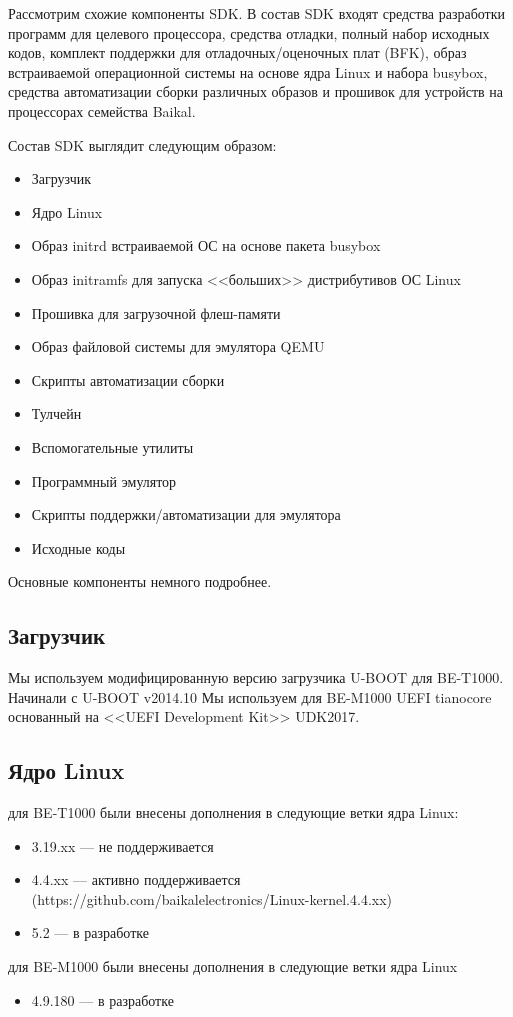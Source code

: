 \documentclass[10pt, a5paper]{article}
\begin{document}
Рассмотрим схожие компоненты SDK. В состав SDK входят средства разработки программ для целевого процессора, средства отладки, полный набор исходных кодов, комплект поддержки для отладочных/оценочных плат (BFK), образ встраиваемой операционной системы на основе ядра Linux и набора busybox, средства автоматизации сборки различных образов и прошивок для устройств на процессорах семейства Baikal.

Состав SDK выглядит следующим образом:

\begin{itemize}
  \item Загрузчик
  \item Ядро Linux
  \item Образ initrd встраиваемой ОС на основе пакета busybox
  \item Образ initramfs для запуска <<больших>> дистрибутивов ОС Linux
  \item Прошивка для загрузочной флеш-памяти
  \item Образ файловой системы для эмулятора QEMU
  \item Скрипты автоматизации сборки
  \item Тулчейн
  \item Вспомогательные утилиты
  \item Программный эмулятор
  \item Скрипты поддержки/автоматизации для эмулятора
  \item Исходные коды
\end{itemize}

Основные компоненты немного подробнее.

\subsection*{Загрузчик}

Мы используем модифицированную версию загрузчика U-BOOT для BE-T1000.
Начинали с U-BOOT v2014.10
Мы используем для BE-M1000 UEFI tianocore основанный на <<UEFI Development Kit>> UDK2017.

\subsection*{Ядро Linux}

для BE-T1000 были внесены дополнения в следующие ветки ядра Linux:
\begin{itemize}
\item 3.19.xx --- не поддерживается
\item 4.4.xx --- активно поддерживается (https://github.com/baikalelectronics/Linux-kernel.4.4.xx)
\item 5.2 --- в разработке
\end{itemize}
для BE-M1000 были внесены дополнения в следующие ветки ядра Linux
\begin{itemize}
\item 4.9.180 --- в разработке
\end{itemize}
\end{document}
